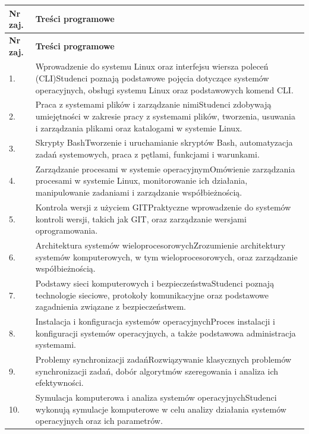 \documentclass[12pt, a4paper]{article}
\newcommand{\thdrule}{\noalign{\global\setlength{\extrarowheight}{0pt}}}
\newcommand{\thdend}{\noalign{\global\setlength{\extrarowheight}{3pt}}}
\begin{document}
{\scriptsize
\begin{longtable}{m{1.5cm}m{14.5cm}}
\thdrule\toprule
\rowcolor{pjatkRed} {\color{white}\textbf{Nr zaj.}} & {\color{white}\textbf{Treści programowe}} \\
\midrule\thdend
\endfirsthead
\thdrule\toprule
\rowcolor{pjatkRed} {\color{white}\textbf{Nr zaj.}} & {\color{white}\textbf{Treści programowe}} \\
\midrule\thdend
\endhead
  \rowcolor{tableRowLight} 1. & Wprowadzenie do systemu Linux oraz interfejsu wiersza poleceń (CLI)Studenci poznają podstawowe pojęcia dotyczące systemów operacyjnych, obsługi systemu Linux oraz podstawowych komend CLI. \\
  \rowcolor{tableRowAlt} 2. & Praca z systemami plików i zarządzanie nimiStudenci zdobywają umiejętności w zakresie pracy z systemami plików, tworzenia, usuwania i zarządzania plikami oraz katalogami w systemie Linux. \\
  \rowcolor{tableRowLight} 3. & Skrypty BashTworzenie i uruchamianie skryptów Bash, automatyzacja zadań systemowych, praca z pętlami, funkcjami i warunkami. \\
  \rowcolor{tableRowAlt} 4. & Zarządzanie procesami w systemie operacyjnymOmówienie zarządzania procesami w systemie Linux, monitorowanie ich działania, manipulowanie zadaniami i zarządzanie współbieżnością. \\
  \rowcolor{tableRowLight} 5. & Kontrola wersji z użyciem GITPraktyczne wprowadzenie do systemów kontroli wersji, takich jak GIT, oraz zarządzanie wersjami oprogramowania. \\
  \rowcolor{tableRowAlt} 6. & Architektura systemów wieloprocesorowychZrozumienie architektury systemów komputerowych, w tym wieloprocesorowych, oraz zarządzanie współbieżnością. \\
  \rowcolor{tableRowLight} 7. & Podstawy sieci komputerowych i bezpieczeństwaStudenci poznają technologie sieciowe, protokoły komunikacyjne oraz podstawowe zagadnienia związane z bezpieczeństwem. \\
  \rowcolor{tableRowAlt} 8. & Instalacja i konfiguracja systemów operacyjnychProces instalacji i konfiguracji systemów operacyjnych, a także podstawowa administracja systemami. \\
  \rowcolor{tableRowLight} 9. & Problemy synchronizacji zadańRozwiązywanie klasycznych problemów synchronizacji zadań, dobór algorytmów szeregowania i analiza ich efektywności. \\
  \rowcolor{tableRowAlt} 10. & Symulacja komputerowa i analiza systemów operacyjnychStudenci wykonują symulacje komputerowe w celu analizy działania systemów operacyjnych oraz ich parametrów. \\
\bottomrule
\end{longtable}}
\end{document}

